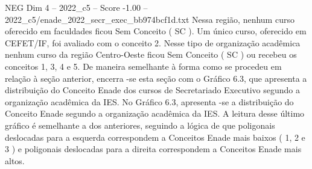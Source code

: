 \begin{textsample}{NEG Dim 4 – 2022\_c5 – Score -1.00 – 2022\_c5/enade\_2022\_secr\_exec\_bb974bcf1d.txt}
Nessa região, nenhum curso oferecido em faculdades ficou Sem Conceito ( SC ).
Um único curso, oferecido em CEFET/IF, foi avaliado com o conceito 2.
Nesse tipo de organização acadêmica nenhum curso da região Centro-Oeste ficou Sem Conceito ( SC ) ou recebeu os conceitos 1, 3, 4 e 5.
De maneira semelhante à forma como se procedeu em relação à seção anterior, encerra -se esta seção com o Gráfico 6.3, que apresenta a distribuição do Conceito Enade dos cursos de Secretariado Executivo segundo a organização acadêmica da IES.
No Gráfico 6.3, apresenta -se a distribuição do Conceito Enade segundo a organização acadêmica da IES.
A leitura desse último gráfico é semelhante a dos anteriores, seguindo a lógica de que poligonais deslocadas para a esquerda correspondem a Conceitos Enade mais baixos ( 1, 2 e 3 ) e poligonais deslocadas para a direita correspondem a Conceitos Enade mais altos.

\end{textsample}

